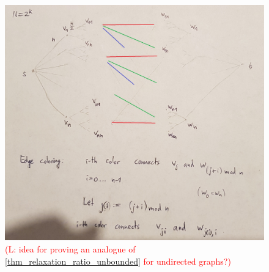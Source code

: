 \documentclass[10pt,a4paper]{article}
\numberwithin{equation}{section}
\newcommand{\comment}[1]{\textcolor{red}{(L: #1)}}
\begin{document}
\printbibliography
\begin{figure}[htpb]
\centering
\includegraphics[width=\textwidth]{img/idea_undirected_approximation_ratio.jpg}
\caption{\comment{idea for proving an analogue of \cref{thm_relaxation_ratio_unbounded} for undirected graphs?}}
\label{fig_undirected_relaxation_ratio}
\end{figure}
\end{document}
